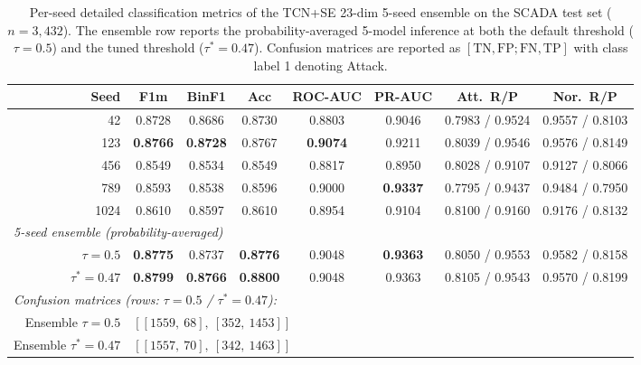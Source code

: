 
\begin{table}[htbp]
\centering
\caption{Per-seed detailed classification metrics of the TCN+SE
23-dim 5-seed ensemble on the SCADA test set ($n=3{,}432$).
The ensemble row reports the probability-averaged 5-model inference at
both the default threshold ($\tau=0.5$) and the tuned threshold
($\tau^{*}=0.47$). Confusion matrices are reported as
$[\text{TN}, \text{FP}; \text{FN}, \text{TP}]$ with class label 1 denoting Attack.}
\label{tab:per-seed}
\setlength{\tabcolsep}{3.5pt}
\renewcommand{\arraystretch}{1.05}
\scriptsize
\begin{tabular}{r c c c c c c c}
\hline\hline
\textbf{Seed} & \textbf{F1m} & \textbf{BinF1} & \textbf{Acc} & \textbf{ROC-AUC} & \textbf{PR-AUC} & \textbf{Att.~R/P} & \textbf{Nor.~R/P} \\
\hline
42      & 0.8728 & 0.8686 & 0.8730 & 0.8803 & 0.9046 & 0.7983 / 0.9524 & 0.9557 / 0.8103 \\
123     & \textbf{0.8766} & \textbf{0.8728} & 0.8767 & \textbf{0.9074} & 0.9211 & 0.8039 / 0.9546 & 0.9576 / 0.8149 \\
456     & 0.8549 & 0.8534 & 0.8549 & 0.8817 & 0.8950 & 0.8028 / 0.9107 & 0.9127 / 0.8066 \\
789     & 0.8593 & 0.8538 & 0.8596 & 0.9000 & \textbf{0.9337} & 0.7795 / 0.9437 & 0.9484 / 0.7950 \\
1024    & 0.8610 & 0.8597 & 0.8610 & 0.8954 & 0.9104 & 0.8100 / 0.9160 & 0.9176 / 0.8132 \\
\hline
\multicolumn{8}{l}{\textit{5-seed ensemble (probability-averaged)}} \\
$\tau=0.5$   & \textbf{0.8775} & 0.8737 & \textbf{0.8776} & 0.9048 & \textbf{0.9363} & 0.8050 / 0.9553 & 0.9582 / 0.8158 \\
$\tau^*=0.47$ & \textbf{0.8799} & \textbf{0.8766} & \textbf{0.8800} & 0.9048 & 0.9363 & 0.8105 / 0.9543 & 0.9570 / 0.8199 \\
\hline
\multicolumn{8}{l}{\textit{Confusion matrices (rows: $\tau=0.5$ / $\tau^*=0.47$):}} \\
Ensemble $\tau=0.5$  & \multicolumn{7}{l}{$[[1559,\ 68],\ [352,\ 1453]]$} \\
Ensemble $\tau^*=0.47$ & \multicolumn{7}{l}{$[[1557,\ 70],\ [342,\ 1463]]$} \\
\hline\hline
\end{tabular}
\end{table}